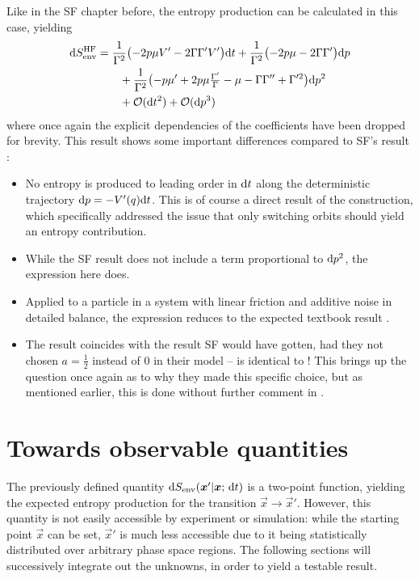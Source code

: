 Like in the SF chapter before, the entropy production  can be calculated in this case, yielding 
%
\begin{equation}\begin{split}
	\label{eqn:hf entropy}
	\mathrm{d}S_\text{env}^{\text{HF}} &=
	\frac1{\Gamma^2}\bigl(-2p\mu V'-2\Gamma\Gamma'V'\bigr)\mathrm{d} t
	+ \frac1{\Gamma^2}\bigl(-2p\mu-2\Gamma\Gamma'\bigr)\mathrm{d} p
	\\&\qquad
	+ \frac1{\Gamma^2}\bigl( -p\mu' + 2p\mu \tfrac{\Gamma'}\Gamma - \mu - \Gamma\Gamma'' + \Gamma'^2 \bigr) \mathrm{d} p^2
	\\&\qquad
	+ \mathcal{O}(\mathrm{d} t^2) + \mathcal{O}(\mathrm{d} p^3)
\end{split}\end{equation}
%
where once again the explicit dependencies of the coefficients have been dropped for brevity. This result shows some important differences compared to SF's result :
%
\begin{itemize}
	\item No entropy is produced to leading order in \(\mathrm{d} t\) along the deterministic trajectory \(\mathrm{d} p = -V'(q)\mathrm{d} t\). This is of course a direct result of the construction, which specifically addressed the issue that only switching orbits should yield an entropy contribution.
	\item While the SF result does not include a term proportional to \(\mathrm{d} p^2\), the expression here does.
	\item Applied to a particle in a system with linear friction and additive noise in detailed balance, the expression reduces to the expected textbook result .
	\item The result coincides with the result SF would have gotten, had they not chosen \(a = \tfrac12\) instead of \(0\) in their model --  is identical to ! This brings up the question once again as to why they made this specific choice, but as mentioned earlier, this is done without further comment in \cite{sf}.
\end{itemize}






\section{Towards observable quantities}

The previously defined quantity \(\mathrm{d}S_\text{env}(\boldsymbol{x}'|\boldsymbol{x};\,\mathrm{d} t)\) is a two-point function, yielding the expected entropy production for the transition \(\vec x\to\vec x'\). However, this quantity is not easily accessible by experiment or simulation: while the starting point \(\vec x\) can be set, \(\vec x'\) is much less accessible due to it being statistically distributed over arbitrary phase space regions. The following sections will successively integrate out the unknowns, in order to yield a testable result.


